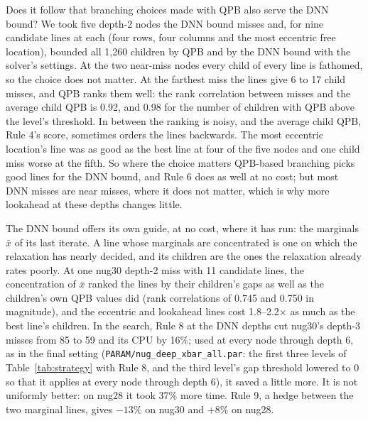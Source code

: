 \documentclass[10pt]{article}
\theoremstyle{remark}
\begin{document}
Does it follow that branching choices made with QPB also serve the DNN bound? We
took five depth-2 nodes the DNN bound misses and, for nine candidate lines at each
(four rows, four columns and the most eccentric free location), bounded all 1,260
children by QPB and by the DNN bound with the solver's settings. At the two
near-miss nodes every child of every line is fathomed, so the choice does not
matter. At the farthest miss the lines give 6 to 17 child misses, and QPB ranks
them well: the rank correlation between misses and the average child QPB is 0.92,
and 0.98 for the number of children with QPB above the level's threshold. In
between the ranking is noisy, and the average child QPB, Rule 4's score, sometimes
orders the lines backwards. The most eccentric location's line was as good as the
best line at four of the five nodes and one child miss worse at the fifth. So where
the choice matters QPB-based branching picks good lines for the DNN bound, and
Rule 6 does as well at no cost; but most DNN misses are near misses, where it does
not matter, which is why more lookahead at these depths changes little.

The DNN bound offers its own guide, at no cost, where it has run: the marginals
$\bar x$ of its last iterate. A line whose marginals are concentrated is one on which
the relaxation has nearly decided, and its children are the ones the relaxation
already rates poorly. At one nug30 depth-2 miss with 11 candidate lines, the
concentration of $\bar x$ ranked the lines by their children's gaps as well as the
children's own QPB values did (rank correlations of 0.745 and 0.750 in magnitude),
and the eccentric and lookahead lines cost 1.8--2.2$\times$ as much as the best
line's children. In the search, Rule 8 at the DNN depths cut nug30's depth-3 misses
from 85 to 59 and its CPU by 16\%; used at every node through depth 6, as in the
final setting (\texttt{PARAM/nug\_deep\_xbar\_all.par}: the first three levels of
Table~\ref{tab:strategy} with Rule 8, and the third level's gap threshold lowered to
0 so that it applies at every node through depth 6), it saved a little more. It is not
uniformly better: on nug28 it took 37\% more time. Rule 9, a hedge between the two
marginal lines, gives $-13\%$ on nug30 and $+8\%$ on nug28.
\end{document}
